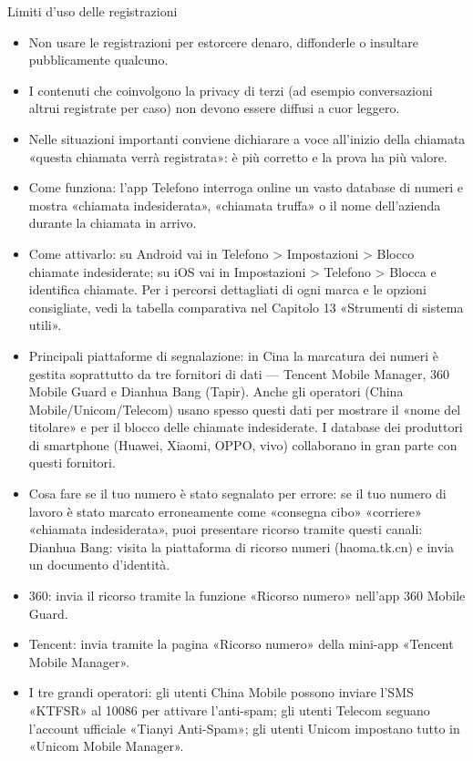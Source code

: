 \begin{tcbwarn}{Limiti d'uso delle registrazioni}
\begin{itemize}
  \item Non usare le registrazioni per estorcere denaro, diffonderle o insultare pubblicamente qualcuno.
  \item I contenuti che coinvolgono la privacy di terzi (ad esempio conversazioni altrui registrate per caso) non devono essere diffusi a cuor leggero.
  \item Nelle situazioni importanti conviene dichiarare a voce all'inizio della chiamata «questa chiamata verrà registrata»: è più corretto e la prova ha più valore.
\end{itemize}

\end{tcbwarn}


\begin{itemize}
  \item Come funziona: l'app Telefono interroga online un vasto database di numeri e mostra «chiamata indesiderata», «chiamata truffa» o il nome dell'azienda durante la chiamata in arrivo.
  \item Come attivarlo: su Android vai in Telefono > Impostazioni > Blocco chiamate indesiderate; su iOS vai in Impostazioni > Telefono > Blocca e identifica chiamate. Per i percorsi dettagliati di ogni marca e le opzioni consigliate, vedi la tabella comparativa nel Capitolo 13 «Strumenti di sistema utili».
  \item Principali piattaforme di segnalazione: in Cina la marcatura dei numeri è gestita soprattutto da tre fornitori di dati — Tencent Mobile Manager, 360 Mobile Guard e Dianhua Bang (Tapir). Anche gli operatori (China Mobile/Unicom/Telecom) usano spesso questi dati per mostrare il «nome del titolare» e per il blocco delle chiamate indesiderate. I database dei produttori di smartphone (Huawei, Xiaomi, OPPO, vivo) collaborano in gran parte con questi fornitori.
  \item Cosa fare se il tuo numero è stato segnalato per errore: se il tuo numero di lavoro è stato marcato erroneamente come «consegna cibo» «corriere» «chiamata indesiderata», puoi presentare ricorso tramite questi canali: Dianhua Bang: visita la piattaforma di ricorso numeri (haoma.tk.cn) e invia un documento d'identità.
  \item 360: invia il ricorso tramite la funzione «Ricorso numero» nell'app 360 Mobile Guard.
  \item Tencent: invia tramite la pagina «Ricorso numero» della mini-app «Tencent Mobile Manager».
  \item I tre grandi operatori: gli utenti China Mobile possono inviare l'SMS «KTFSR» al 10086 per attivare l'anti-spam; gli utenti Telecom seguano l'account ufficiale «Tianyi Anti-Spam»; gli utenti Unicom impostano tutto in «Unicom Mobile Manager».
\end{itemize}

